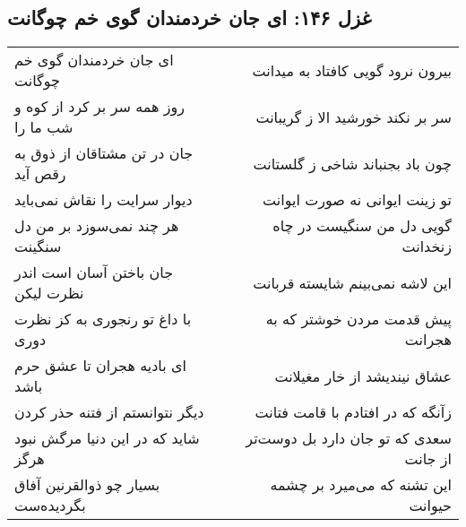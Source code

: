 \begin{center}
\section*{غزل ۱۴۶: ای جان خردمندان گوی خم چوگانت}
\label{sec:146}
\begin{longtable}{l p{0.5cm} r}
ای جان خردمندان گوی خم چوگانت
&&
بیرون نرود گویی کافتاد به میدانت
\\
روز همه سر بر کرد از کوه و شب ما را
&&
سر بر نکند خورشید الا ز گریبانت
\\
جان در تن مشتاقان از ذوق به رقص آید
&&
چون باد بجنباند شاخی ز گلستانت
\\
دیوار سرایت را نقاش نمی‌باید
&&
تو زینت ایوانی نه صورت ایوانت
\\
هر چند نمی‌سوزد بر من دل سنگینت
&&
گویی دل من سنگیست در چاه زنخدانت
\\
جان باختن آسان است اندر نظرت لیکن
&&
این لاشه نمی‌بینم شایسته قربانت
\\
با داغ تو رنجوری به کز نظرت دوری
&&
پیش قدمت مردن خوشتر که به هجرانت
\\
ای بادیه هجران تا عشق حرم باشد
&&
عشاق نیندیشد از خار مغیلانت
\\
دیگر نتوانستم از فتنه حذر کردن
&&
زآنگه که در افتادم با قامت فتانت
\\
شاید که در این دنیا مرگش نبود هرگز
&&
سعدی که تو جان دارد بل دوست‌تر از جانت
\\
بسیار چو ذوالقرنین آفاق بگردیده‌ست
&&
این تشنه که می‌میرد بر چشمه حیوانت
\\
\end{longtable}
\end{center}
